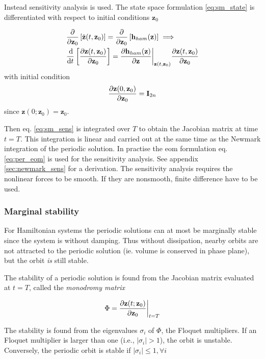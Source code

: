 Instead sensitivity analysis is used. The state space formulation
\eqref{eq:sm_state} is differentiated with respect to initial conditions $\bm
z_0$

\begin{align}
  &\frac{\p}{\p \bm z_0} \left[ \dot{\bm z}(t, \bm z_0) \right] =
    \frac{\p}{\p \bm z_0} \left[ \bm h_{ham}(\bm z) \right] \implies
  \nonumber \\
  &\frac{\d}{\d t} \left[  \frac{\p \bm z(t, \bm z_0)}{\p \bm z_0} \right] =
    \frac{\p \bm h_{ham}(\bm z)}{\p \bm z}\bigg|_{\bm z(t,\bm z_0)}
    \frac{\p \bm z(t, \bm z_0)}{\p \bm z_0}
    \label{eq:sm_sens}
\end{align}
with initial condition
\begin{equation}
  \label{eq:sm_sens_init}
  \frac{\p \bm z(0,\bm z_0)}{\p \bm z_0} = \bm I_{2n}
\end{equation}
since $\bm z(0;\bm z_0) = \bm z_0$.

Then eq. \eqref{eq:sm_sens} is integrated over $T$ to obtain the Jacobian matrix
at time $t=T$. This integration is linear and carried out at the same time as
the Newmark integration of the periodic solution. In practise the eom
formulation eq. \eqref{eq:per_eom} is used for the sensitivity analysis. See
appendix \ref{sec:newmark_sens} for a derivation. The sensitivity analysis
requires the nonlinear forces to be smooth. If they are nonsmooth, finite
difference have to be used.

\subsubsection{Marginal stability}
\label{sec:sm_stab}


For Hamiltonian systems the periodic solutions can at most be marginally stable
since the system is without damping. Thus without dissipation, nearby orbits are
not attracted to the periodic solution (ie. volume is conserved in phase plane),
but the orbit \textit{is} still stable.

The stability of a periodic solution is found from the Jacobian matrix evaluated
at $t=T$, called the \textit{monodromy matrix}

\begin{equation}
  \label{eq:sm_stab}
  \Phi = \frac{\p \bm z(t; \bm z_0)}{\p \bm z_0}\bigg|_{t=T}
\end{equation}

The stability is found from the eigenvalues $\sigma_i$ of $\Phi$, the Floquet
multipliers. If an Floquet multiplier is larger than one (i.e., $|\sigma_i|>
1$), the orbit is unstable. Conversely, the periodic orbit is stable if
$|\sigma_i| \leq 1, \forall i$

